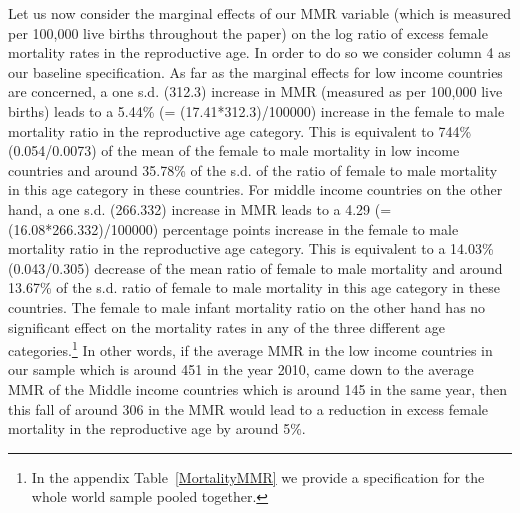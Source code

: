 \documentclass[11pt]{article}
\begin{document}
\begin{spacing}{1.4}
Let us now consider the marginal effects of our MMR variable (which is measured per 100,000 live births throughout the paper) on the log ratio of excess female mortality rates in the reproductive age. In order to do so we consider column 4 as our baseline specification. As far as the marginal effects for low income countries are concerned, a one s.d. (312.3) increase in MMR (measured as per 100,000 live births) leads to a 5.44\% (= (17.41*312.3)/100000) increase in the female to male mortality ratio in the reproductive age category. This is equivalent to 744\% (0.054/0.0073) of the mean of the female to male mortality in low income countries and around 35.78\% of the s.d. of the ratio of female to male mortality in this age category in these countries. For middle income countries on the other hand, a one s.d. (266.332) increase in MMR leads to a 4.29 (= (16.08*266.332)/100000) percentage points increase in the female to male mortality ratio in the reproductive age category. This is equivalent to a 14.03\% (0.043/0.305) decrease of the mean ratio of female to male mortality and around 13.67\% of the s.d. ratio of female to male mortality in this age category in these countries. The female to male infant mortality ratio on the other hand has no significant effect on the mortality rates in any of the three different age categories.\footnote{In the appendix Table~\ref{MortalityMMR} we provide a specification for the whole world sample pooled together.} In other words, if the average MMR in the low income countries in our sample which is around 451 in the year 2010, came down to the average MMR of the Middle income countries which is around 145 in the same year, then this fall of around 306 in the MMR would lead to a reduction in excess female mortality in the reproductive age by around 5\%. 

%



\end{spacing}
\end{document}
